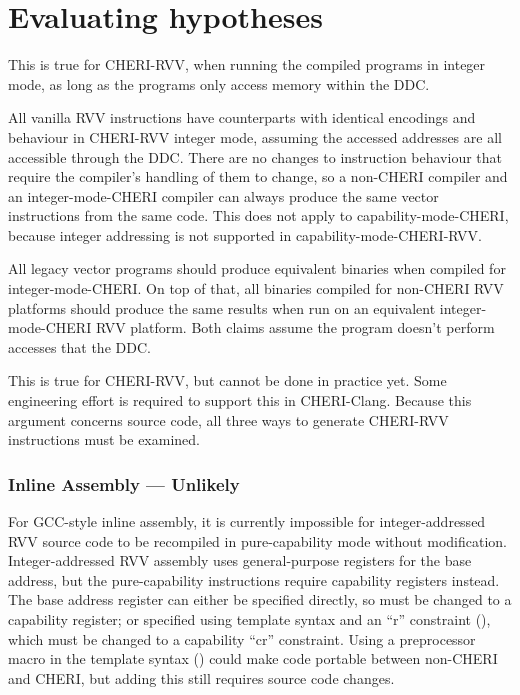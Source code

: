 \section{Evaluating hypotheses}\label{chap:software:sec:hypotheses}

This is true for CHERI-RVV, when running the compiled programs in integer mode, as long as the programs only access memory within the DDC.

All vanilla RVV instructions have counterparts with identical encodings and behaviour in CHERI-RVV integer mode, assuming the accessed addresses are all accessible through the DDC.
There are no changes to instruction behaviour that require the compiler's handling of them to change, so a non-CHERI compiler and an integer-mode-CHERI compiler can always produce the same vector instructions from the same code.
This does not apply to capability-mode-CHERI, because integer addressing is not supported in capability-mode-CHERI-RVV.

All legacy vector programs should produce equivalent binaries when compiled for integer-mode-CHERI.
On top of that, all binaries compiled for non-CHERI RVV platforms should produce the same results when run on an equivalent integer-mode-CHERI RVV platform.
Both claims assume the program doesn't perform accesses that  the DDC.

This is true for CHERI-RVV, but cannot be done in practice yet.
Some engineering effort is required to support this in CHERI-Clang.
Because this argument concerns source code, all three ways to generate CHERI-RVV instructions must be examined.

\subsubsection*{Inline Assembly --- Unlikely}
For GCC-style inline assembly, it is currently impossible for integer-addressed RVV source code to be recompiled in pure-capability mode without modification.
Integer-addressed RVV assembly uses general-purpose registers for the base address, but the pure-capability instructions require capability registers instead.
The base address register can either be specified directly, so must be changed to a capability register; or specified using template syntax and an ``r'' constraint (), which must be changed to a capability ``cr'' constraint.
Using a preprocessor macro in the template syntax () could make code portable between non-CHERI and CHERI, but adding this still requires source code changes.

